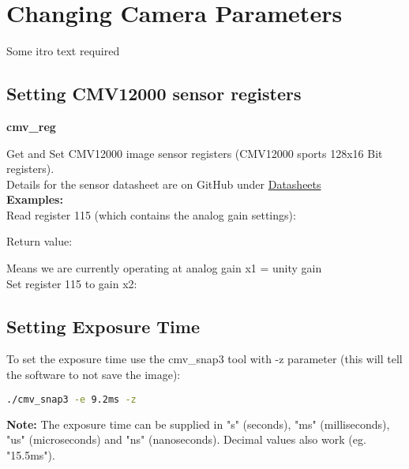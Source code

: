 \section{Changing Camera Parameters}

Some itro text required\\

\subsection{Setting CMV12000 sensor registers}

\textbf{cmv\_reg}

Get and Set CMV12000 image sensor registers (CMV12000 sports 128x16 Bit registers).\\

Details for the sensor datasheet are on GitHub under \href{https://github.com/apertus-open-source-cinema/beta-hardware/tree/master/Datasheets}{Datasheets}\\

\textbf{Examples:}\\

Read register 115 (which contains the analog gain settings): 


Return value:

Means we are currently operating at analog gain x1 = unity gain\\

Set register 115 to gain x2: 

\subsection{Setting Exposure Time}

To set the exposure time use the cmv\_snap3 tool with -z parameter (this will tell the software to not save the image): 

\begin{lstlisting}[language=bash,morekeywords=$,keywordstyle=\bfseries,frame=none,xleftmargin=.25in,belowskip=2em, aboveskip=2em]
./cmv_snap3 -e 9.2ms -z
\end{lstlisting}

\textbf{Note:} The exposure time can be supplied in "s" (seconds), "ms" (milliseconds), "us" (microseconds) and "ns" (nanoseconds). Decimal values also work (eg. "15.5ms"). 



